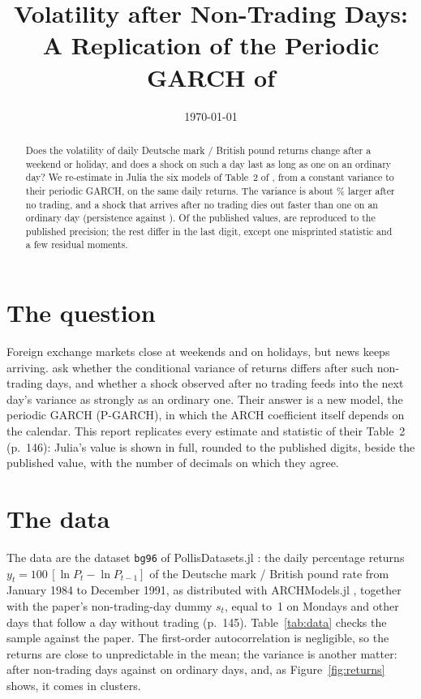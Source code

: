 \documentclass[11pt]{article}
\title{Volatility after Non-Trading Days:\\ A Replication of the Periodic GARCH of \citet{bollerslev1996periodic}}
\author{}
\date{\today}
\begin{document}
\maketitle

\begin{abstract}
\noindent Does the volatility of daily Deutsche mark / British pound returns change after a weekend or holiday, and does a shock on such a day last as long as one on an ordinary day? We re-estimate in Julia the six models of Table~2 of \citet{bollerslev1996periodic}, from a constant variance to their periodic GARCH, on the same \nobs{} daily returns. The variance is about \varlarger\% larger after no trading, and a shock that arrives after no trading dies out faster than one on an ordinary day (persistence \persistnontrading{} against \persistord). Of the \nvalues{} published values, \nfull{} are reproduced to the published precision; the rest differ in the last digit, except one misprinted statistic and a few residual moments.
\end{abstract}

\section{The question}

Foreign exchange markets close at weekends and on holidays, but news keeps arriving. \citet{bollerslev1996periodic} ask whether the conditional variance of returns differs after such non-trading days, and whether a shock observed after no trading feeds into the next day's variance as strongly as an ordinary one. Their answer is a new model, the periodic GARCH (P-GARCH), in which the ARCH coefficient itself depends on the calendar. This report replicates every estimate and statistic of their Table~2 (p.~146): Julia's value is shown in full, rounded to the published digits, beside the published value, with the number of decimals on which they agree.

\section{The data}

The data are the dataset \texttt{bg96} of PollisDatasets.jl \citep{pollisdatasets}: the daily percentage returns $y_t = 100\,[\ln P_t - \ln P_{t-1}]$ of the Deutsche mark / British pound rate from January 1984 to December 1991, as distributed with ARCHModels.jl \citep{archmodels}, together with the paper's non-trading-day dummy $s_t$, equal to~1 on Mondays and other days that follow a day without trading (p.~145). Table~\ref{tab:data} checks the sample against the paper. The first-order autocorrelation is negligible, so the returns are close to unpredictable in the mean; the variance is another matter: \varnontrading{} after non-trading days against \varordinary{} on ordinary days, and, as Figure~\ref{fig:returns} shows, it comes in clusters.
\end{document}
